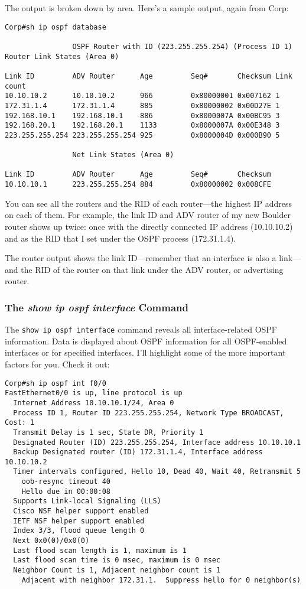 The output is broken down by area. Here's a sample output, again from
Corp:

\begin{verbatim}
Corp#sh ip ospf database
 
                OSPF Router with ID (223.255.255.254) (Process ID 1)
Router Link States (Area 0)
 
Link ID         ADV Router      Age         Seq#       Checksum Link count
10.10.10.2      10.10.10.2      966         0x80000001 0x007162 1
172.31.1.4      172.31.1.4      885         0x80000002 0x00D27E 1
192.168.10.1    192.168.10.1    886         0x8000007A 0x00BC95 3
192.168.20.1    192.168.20.1    1133        0x8000007A 0x00E348 3
223.255.255.254 223.255.255.254 925         0x8000004D 0x000B90 5
 
                Net Link States (Area 0)
 
Link ID         ADV Router      Age         Seq#       Checksum
10.10.10.1      223.255.255.254 884         0x80000002 0x008CFE
\end{verbatim}

\protect\hypertarget{c18.xhtmlux5cux23Page_768}{}{}You can see all the
routers and the RID of each router---the highest IP address on each of
them. For example, the link ID and ADV router of my new Boulder router
shows up twice: once with the directly connected IP address (10.10.10.2)
and as the RID that I set under the OSPF process (172.31.1.4).

The router output shows the link ID---remember that an interface is also
a link---and the RID of the router on that link under the ADV router, or
advertising router.

\subsubsection[The \emph{show ip ospf interface}
Command]{\texorpdfstring{\protect\hypertarget{c18.xhtmlux5cux23c18-sec-14}{}{}The
\emph{show ip ospf interface}
Command}{The show ip ospf interface Command}}

The \texttt{show\ ip\ ospf\ interface} command reveals all
interface-related OSPF information. Data is displayed about OSPF
information for all OSPF-enabled interfaces or for specified interfaces.
I'll highlight some of the more important factors for you. Check it out:

\begin{verbatim}
Corp#sh ip ospf int f0/0
FastEthernet0/0 is up, line protocol is up
  Internet Address 10.10.10.1/24, Area 0
  Process ID 1, Router ID 223.255.255.254, Network Type BROADCAST, Cost: 1
  Transmit Delay is 1 sec, State DR, Priority 1
  Designated Router (ID) 223.255.255.254, Interface address 10.10.10.1
  Backup Designated router (ID) 172.31.1.4, Interface address 10.10.10.2
  Timer intervals configured, Hello 10, Dead 40, Wait 40, Retransmit 5
    oob-resync timeout 40
    Hello due in 00:00:08
  Supports Link-local Signaling (LLS)
  Cisco NSF helper support enabled
  IETF NSF helper support enabled
  Index 3/3, flood queue length 0
  Next 0x0(0)/0x0(0)
  Last flood scan length is 1, maximum is 1
  Last flood scan time is 0 msec, maximum is 0 msec
  Neighbor Count is 1, Adjacent neighbor count is 1
    Adjacent with neighbor 172.31.1.  Suppress hello for 0 neighbor(s)
\end{verbatim}


